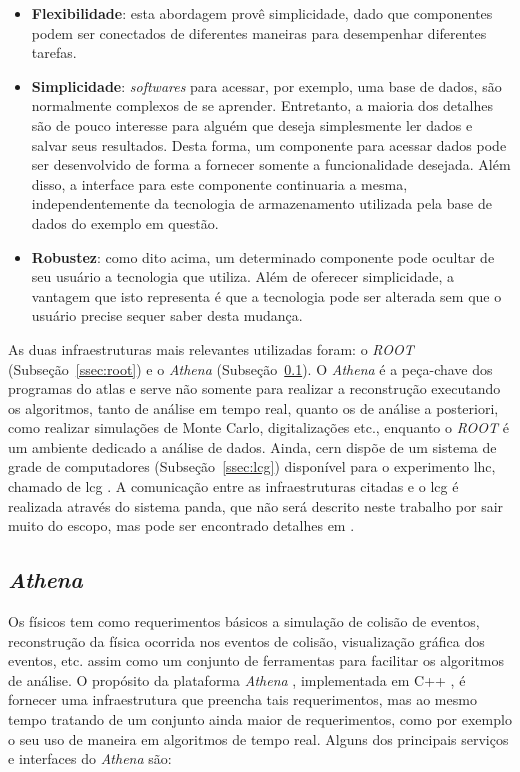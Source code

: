 \begin{itemize}
\item \textbf{Flexibilidade}: esta abordagem provê simplicidade, dado que componentes podem
ser conectados de diferentes maneiras para desempenhar diferentes tarefas.
\item \textbf{Simplicidade}: \emph{softwares} para acessar, por exemplo, uma base de dados, são
normalmente complexos de se aprender. Entretanto, a maioria dos detalhes são de
pouco interesse para alguém que deseja simplesmente ler dados e salvar seus
resultados. Desta forma, um componente para acessar dados pode ser desenvolvido
de forma a fornecer somente a funcionalidade desejada. Além disso, a interface
para este componente continuaria a mesma, independentemente da tecnologia de
armazenamento utilizada pela base de dados do exemplo em questão.
\item \textbf{Robustez}: como dito acima, um determinado componente pode ocultar de seu
usuário a tecnologia que utiliza. Além de oferecer simplicidade, a vantagem que
isto representa é que a tecnologia pode ser alterada sem que o usuário precise
sequer saber desta mudança.
\end{itemize}

As duas infraestruturas mais relevantes utilizadas foram: o \emph{ROOT}
(Subseção~\ref{ssec:root}) e o \emph{Athena} (Subseção~\ref{ssec:athena}). 
O \emph{Athena} é a peça-chave dos programas do \gls{atlas} e serve não somente
para realizar a reconstrução executando os algoritmos, tanto de análise em tempo
real, quanto os de análise a posteriori, como realizar simulações de Monte Carlo, digitalizações etc., 
enquanto o \emph{ROOT} é um ambiente dedicado a análise de dados. 
Ainda, \gls{cern} dispõe de um sistema de grade de 
computadores (Subseção~\ref{ssec:lcg}) disponível para o experimento \gls{lhc}, chamado de \gls{lcg} 
\cite{grid}. A comunicação entre as infraestruturas citadas e o \gls{lcg} é realizada através do sistema
\gls{panda}, que não será descrito neste trabalho por sair muito do escopo, 
mas pode ser encontrado detalhes em \cite{panda}.

\subsection{\emph{Athena}}
\label{ssec:athena}


Os físicos tem como requerimentos básicos a simulação de colisão de
eventos, reconstrução da física ocorrida nos eventos de colisão, visualização
gráfica dos eventos, etc. assim como um conjunto de ferramentas para facilitar
os algoritmos de análise. O propósito da plataforma \emph{Athena}
\cite{atlascwb,atlaswb}, implementada em C++ \cite{CPP_COMPLETE}, 
é fornecer uma infraestrutura que preencha tais requerimentos, 
mas ao mesmo tempo tratando de um conjunto ainda maior de 
requerimentos, como por exemplo o seu uso de maneira em algoritmos de tempo real. 
Alguns dos principais serviços e interfaces do \emph{Athena} são:

